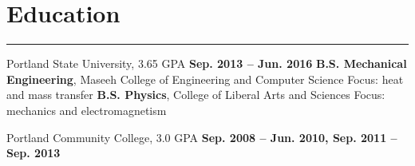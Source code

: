 \section{Education}
	\noindent\rule{\textwidth}{\hlinewidth}
	\begin{innerlist}
	\item Portland State University, 3.65 GPA	\hfill\textbf{Sep. 2013 -- Jun. 2016}
		\subitem \textbf{B.S. Mechanical Engineering}, Maseeh College of Engineering and Computer Science
		\subsubitem Focus: heat and mass transfer
		\subitem\textbf{B.S. Physics}, College of Liberal Arts and Sciences
		\subsubitem Focus: mechanics and electromagnetism
		\subitem 
	\item Portland Community College, 3.0 GPA	\hfill\textbf{Sep. 2008 -- Jun. 2010, Sep. 2011 -- Sep. 2013}
	\end{innerlist}
\vfill
